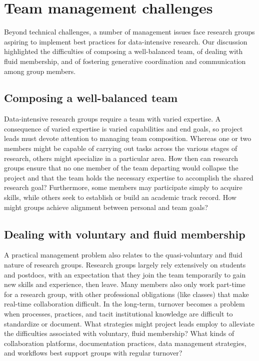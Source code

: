 \documentclass[11pt]{elife}
\begin{document}
\section{Team management challenges}
 
Beyond technical challenges, a number of management issues face research groups aspiring to implement best practices for data-intensive research. Our discussion highlighted the difficulties of composing a well-balanced team, of dealing with fluid membership, and of fostering generative coordination and communication among group members.
 
\subsection{Composing a well-balanced team}

Data-intensive research groups require a team with varied expertise. A consequence of varied expertise is varied capabilities and end goals, so project leads must devote attention to managing team composition. Whereas one or two members might be capable of carrying out tasks across the various stages of research, others might specialize in a particular area. How then can research groups ensure that no one member of the team departing would collapse the project and that the team holds the necessary expertise to accomplish the shared research goal? Furthermore, some members may participate simply to acquire skills, while others seek to establish or build an academic track record. How might groups achieve alignment between personal and team goals?

\subsection{Dealing with voluntary and fluid membership}

A practical management problem also relates to the quasi-voluntary and fluid nature of research groups. Research groups largely rely extensively on students and postdocs, with an expectation that they join the team temporarily to gain new skills and experience, then leave. Many members also only work part-time for a research group, with other professional obligations (like classes) that make real-time collaboration difficult. In the long-term, turnover becomes a problem when processes, practices, and tacit institutional knowledge are difficult to standardize or document. What strategies might project leads employ to alleviate the difficulties associated with voluntary, fluid membership? What kinds of collaboration platforms, documentation practices, data management strategies, and workflows best support groups with regular turnover?
\end{document}
